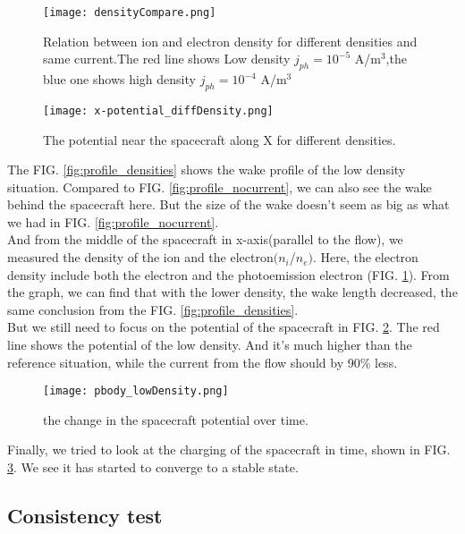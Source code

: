 \documentclass[aip, 
rsi, 
amsmath,
amssymb,
longbibliography,
preprint]{revtex4-1}
\begin{document}
\begin{figure}[!ht]
\texttt{[image: densityCompare.png]}
\caption{Relation between ion and electron density for different densities and same current.The red line shows Low density $j_{ph} = 10^{-5}$ A/m$^3$,the blue one shows high density $j_{ph} = 10^{-4}$ A/m$^3$} \label{fig:densitycompare}
\end{figure}

\begin{figure}[!ht]
\texttt{[image: x-potential\_diffDensity.png]}
\caption{The potential near the spacecraft along X for different densities. \label{fig:end}}
\end{figure}

The FIG. \ref{fig:profile_densities} shows the wake profile of the low density situation. Compared to FIG. \ref{fig:profile_nocurrent}, we can also see the wake behind the spacecraft here. But the size of the wake doesn't seem as big as what we had in FIG. \ref{fig:profile_nocurrent}.\\

And from the middle of the spacecraft in x-axis(parallel to the flow), we measured the density of the ion and the electron$(n_i$/$n_e)$. Here, the electron density include both the electron and the photoemission electron (FIG. \ref{fig:densitycompare}). From the graph, we can find that with the lower density, the wake length decreased, the same conclusion from the FIG. \ref{fig:profile_densities}.\\

But we still need to focus on the potential of the spacecraft in FIG. \ref{fig:end}. The red line shows the potential of the low density. And it's much higher than the reference situation, while the current from the flow should by 90\% less.

\begin{figure}[!ht]
\texttt{[image: pbody\_lowDensity.png]}
\caption{the change in the spacecraft potential over time.\label{fig:DensityTime}}
\end{figure}

Finally, we tried to look at the charging of the spacecraft in time, shown in FIG. \ref{fig:DensityTime}. We see it has started to converge to a stable state.

\subsection{Consistency test}
\end{document}
